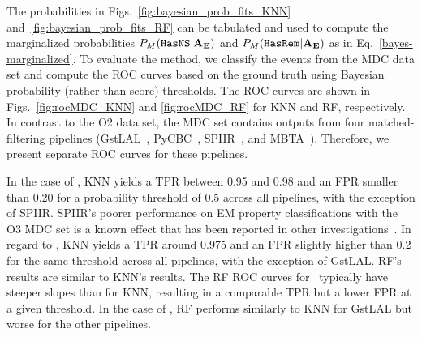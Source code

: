 

The probabilities in Figs.~\ref{fig:bayesian_prob_fits_KNN} and~\ref{fig:bayesian_prob_fits_RF} can be tabulated and used to compute the marginalized probabilities $P_M({{\tt HasNS}}|{\bf
A}_{\bf E})$ and $P_M({{\tt HasRem}}|{\bf A}_{\bf E})$ as in Eq.~\eqref{bayes-marginalized}. To evaluate the method, we classify the events from the \ac{MDC} data set and compute the \ac{ROC}
curves based on the ground truth using Bayesian probability (rather than score) thresholds. The \ac{ROC} curves are shown in Figs.~\ref{fig:rocMDC_KNN} and \ref{fig:rocMDC_RF} for
\ac{KNN} and \ac{RF}, respectively. In contrast to the \ac{O2} data set, the \ac{MDC} set contains outputs from four matched-filtering pipelines
(GstLAL~\cite{Sachdev:2019vvd,PhysRevD.95.042001,Sachdev:2020lfd},  PyCBC~\cite{Nitz:2018rgo,DalCanton:2020vpm}, SPIIR~\cite{Chu:2020pjv}, and MBTA~\cite{Adams:2015ulm}). Therefore, we present separate \ac{ROC} curves
for these pipelines. 


In the case of \hasns, \ac{KNN} yields a \ac{TPR} between 0.95 and 0.98 and an \ac{FPR} smaller than 0.20 for a probability threshold of 0.5 across all pipelines, with the exception of SPIIR. SPIIR's
poorer performance on \ac{EM} property classifications with the \ac{O3} \ac{MDC} set is a known effect that has been reported in other investigations~\cite{Chaudhary:2023vec}. In regard to \hasrem,
\ac{KNN} yields a \ac{TPR} around 0.975 and an \ac{FPR} slightly higher than 0.2 for the same threshold across all pipelines, with the exception of GstLAL. \ac{RF}'s results are similar to \ac{KNN}'s
results. The \ac{RF} \ac{ROC} curves for \hasns\ typically have steeper slopes than for \ac{KNN}, resulting in a comparable \ac{TPR} but a lower \ac{FPR} at a given threshold. In the case of \hasrem,
\ac{RF} performs similarly to \ac{KNN} for GstLAL but worse for the other pipelines.


